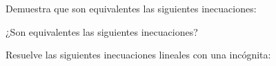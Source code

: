 \documentclass[spanish, 12pt]{exam}
\begin{document}
\begin{questions}

\question Demuestra que son equivalentes las siguientes inecuaciones:
\begin{multicols}{3}
\end{multicols}

\question ¿Son equivalentes las siguientes inecuaciones?
\begin{multicols}{3}
\end{multicols}

\question Resuelve las siguientes inecuaciones lineales con una incógnita:
\begin{multicols}{3}
\end{multicols}
\end{questions}
\end{document}
